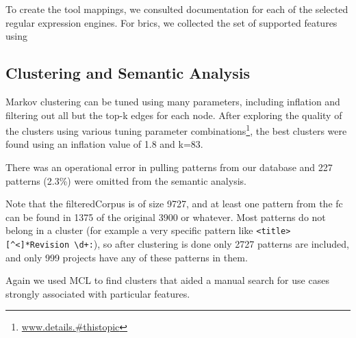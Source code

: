 To create the tool mappings, we consulted documentation for each of the selected regular expression engines. For brics, we collected the set of supported features using


\subsection{Clustering and Semantic Analysis}
Markov clustering can be tuned using many parameters, including inflation and filtering out all but the top-k edges for each node.  After exploring the quality of the clusters using various tuning parameter combinations\footnote{\url{www.details.#thistopic}}, the best clusters were found using an inflation value of 1.8 and k=83.

There was an operational error in pulling  patterns from our database and 227 patterns (2.3\%) were omitted from the semantic analysis.

Note that the filteredCorpus is of size 9727, and at least one pattern from the fc can be found in 1375 of the original 3900 or whatever.  Most patterns do not belong in a cluster (for example a very specific pattern like \verb!<title>[^<]*Revision \d+:!), so after clustering is done only 2727 patterns are included, and only 999 projects have any of these patterns in them.




Again we used MCL to find clusters that aided a manual search for use cases strongly associated with particular features.











